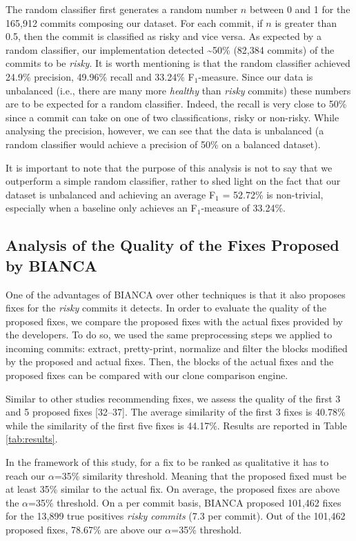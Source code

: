 \documentclass[conference]{IEEEtran}
\begin{document}
The random classifier first generates a random number $n$ between 0 and
1 for the 165,912 commits composing our dataset. For each commit, if $n$
is greater than 0.5, then the commit is classified as risky and vice
versa. As expected by a random classifier, our implementation detected
\textasciitilde{}50\% (82,384 commits) of the commits to be
\emph{risky}. It is worth mentioning is that the random classifier
achieved 24.9\% precision, 49.96\% recall and 33.24\% F$_1$-measure.
Since our data is unbalanced (i.e., there are many more \emph{healthy}
than \emph{risky} commits) these numbers are to be expected for a random
classifier. Indeed, the recall is very close to 50\% since a commit can
take on one of two classifications, risky or non-risky. While analysing
the precision, however, we can see that the data is unbalanced (a random
classifier would achieve a precision of 50\% on a balanced dataset).

It is important to note that the purpose of this analysis is not to say
that we outperform a simple random classifier, rather to shed light on
the fact that our dataset is unbalanced and achieving an average F$_1$ =
52.72\% is non-trivial, especially when a baseline only achieves an
F$_1$-measure of 33.24\%.

\subsection{Analysis of the Quality of the Fixes Proposed by
BIANCA}\label{analysis-of-the-quality-of-the-fixes-proposed-by-bianca}

One of the advantages of BIANCA over other techniques is that it also
proposes fixes for the \emph{risky} commits it detects. In order to
evaluate the quality of the proposed fixes, we compare the proposed
fixes with the actual fixes provided by the developers. To do so, we
used the same preprocessing steps we applied to incoming commits:
extract, pretty-print, normalize and filter the blocks modified by the
proposed and actual fixes. Then, the blocks of the actual fixes and the
proposed fixes can be compared with our clone comparison engine.

Similar to other studies recommending fixes, we assess the quality of
the first 3 and 5 proposed fixes {[}32--37{]}. The average similarity of
the first 3 fixes is 40.78\% while the similarity of the first five
fixes is 44.17\%. Results are reported in Table \ref{tab:results}.

In the framework of this study, for a fix to be ranked as qualitative it
has to reach our $\alpha$=35\% similarity threshold. Meaning that the
proposed fixed must be at least 35\% similar to the actual fix. On
average, the proposed fixes are above the $\alpha$=35\% threshold. On a
per commit basis, BIANCA proposed 101,462 fixes for the 13,899 true
positives \emph{risky commits} (7.3 per commit). Out of the 101,462
proposed fixes, 78.67\% are above our $\alpha$=35\% threshold.
\end{document}
